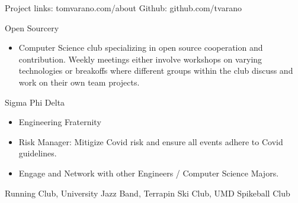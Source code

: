 \documentclass[11pt]{article}
\begin{document}
{\fontsize{8}{10}\robotocondlight Project links: tomvarano.com/about \hfill Github: github.com/tvarano
}
\hsep
{\fontsize{10}{12}\robotocondlight
\noindent Open Sourcery
\begin{itemize}[noitemsep,nolistsep]
    \item Computer Science club specializing in open source cooperation and contribution. Weekly meetings either involve workshops on varying 
    technologies or breakoffs where different groups within the club discuss and work on their own team projects. 
\end{itemize}
Sigma Phi Delta
\begin{itemize}[noitemsep,nolistsep]
    \item Engineering Fraternity
    \item Risk Manager: Mitigize Covid risk and ensure all events adhere to Covid guidelines. 
    \item Engage and Network with other Engineers / Computer Science Majors.
\end{itemize}
Running Club, University Jazz Band, Terrapin Ski Club, UMD Spikeball Club
}
\end{document}
